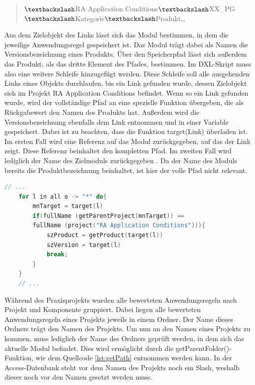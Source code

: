\begin{quotation}
    $\textbackslash$RA Application Conditions$\textbackslash$XX\_PG$\textbackslash$Kategorie$\textbackslash$Produkt\dots
\end{quotation}

Aus dem Zielobjekt des Links lässt sich das Modul bestimmen, in dem die jeweilige Anwendungsregel gespeichert ist. Das Modul trägt dabei als Namen die Versionsbezeichnung eines Produkts.
Über den Speicherpfad lässt sich außerdem das Produkt, als das dritte Element des Pfades, bestimmen. Im \ac{DXL}-Skript muss also eine weitere Schleife hinzugefügt werden.
Diese Schleife soll alle ausgehenden Links eines Objekts durchlaufen, bis ein Link gefunden wurde, dessen Zielobjekt sich im Projekt RA Application Conditions befindet.
Wenn so ein Link gefunden wurde, wird der vollständige Pfad an eine spezielle Funktion übergeben, die als Rückgabewert den Namen des Produkts hat.
Außerdem wird die Versionsbezeichnung ebenfalls dem Link entnommen und in einer Variable gespeichert. Dabei ist zu beachten, dass die Funktion target(Link) überladen ist.
Im ersten Fall wird eine Referenz auf das Modul zurückgegeben, auf das der Link zeigt. Diese Referenz beinhaltet den kompletten Pfad. Im zweiten Fall wird lediglich der Name des Zielmoduls 
zurückgegeben \cite[vgl. S.391]{DXL}. Da der Name des Moduls bereits die Produktbezeichnung beinhaltet, ist hier der volle Pfad nicht relevant.

\begin{lstlisting}[language = C++, caption={Produkt- und Versionsbezeichnung bestimmen},captionpos=b, label = lst:getProductVersion, float, floatplacement=H]
    // ...
    for l in all o -> "*" do{
        mnTarget = target(l)
        if(fullName (getParentProject(mnTarget)) == 
        fullName (project("RA Application Conditions"))){
            szProduct = getProduct(target(l)) 
            szVersion = target(l)
            break;
        } 
    }
    // ...
\end{lstlisting}

Während des Praxisprojekts wurden alle bewerteten Anwendungsregeln nach Projekt und Komponente gruppiert. Dabei liegen alle bewerteten Anwendungsregeln eines Projekts jeweils in einem Ordner.
Der Name dieses Ordners trägt den Namen des Projekts. Um nun an den Namen eines Projekts zu kommen, muss lediglich der Name des Ordners geprüft werden, in dem sich das aktuelle Modul befindet.
Dies wird ermöglicht durch die getParentFolder()-Funktion, wie dem Quellcode \ref*{lst:getPath} entnommen werden kann. In der Access-Datenbank steht vor dem Namen des Projekts noch ein 
Slash, weshalb dieser noch vor den Namen gesetzt werden muss.

